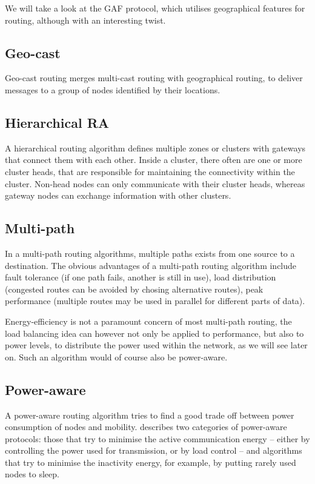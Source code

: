 \documentclass[conference]{IEEEtran}
\begin{document}
We will take a look at the GAF protocol, which utilises geographical
features for routing, although with an interesting twist.

\subsection{Geo-cast}
Geo-cast routing merges multi-cast routing with geographical routing, to
deliver messages to a group of nodes identified by their locations.

\subsection{Hierarchical RA}
A hierarchical routing algorithm defines multiple zones or clusters with
gateways that connect them with each other. Inside a cluster, there often
are one or more cluster heads, that are responsible for maintaining the
connectivity within the cluster. Non-head nodes can only communicate with
their cluster heads, whereas gateway nodes can exchange information with
other clusters.


\subsection{Multi-path}
In a multi-path routing algorithms, multiple paths exists from one source
to a destination. The obvious advantages of a multi-path routing
algorithm include fault tolerance (if one path fails, another is still in
use), load distribution (congested routes can be avoided by chosing alternative
routes), peak performance (multiple routes may be used in parallel for different
parts of data).

Energy-efficiency is not a paramount concern of most multi-path routing, the
load balancing idea can however not only be applied to performance, but also
to power levels, to distribute the power used within the network, as we will
see later on. Such an algorithm would of course also be power-aware.

\subsection{Power-aware}
A power-aware routing algorithm tries to find a good trade off between
power consumption of nodes and mobility. \cite{main1} describes two categories
of power-aware protocols: those that try to minimise the active communication energy -- either
by controlling the power used for transmission, or by load control -- and
algorithms that try to minimise the inactivity energy, for example, by putting
rarely used nodes to sleep.
\end{document}
